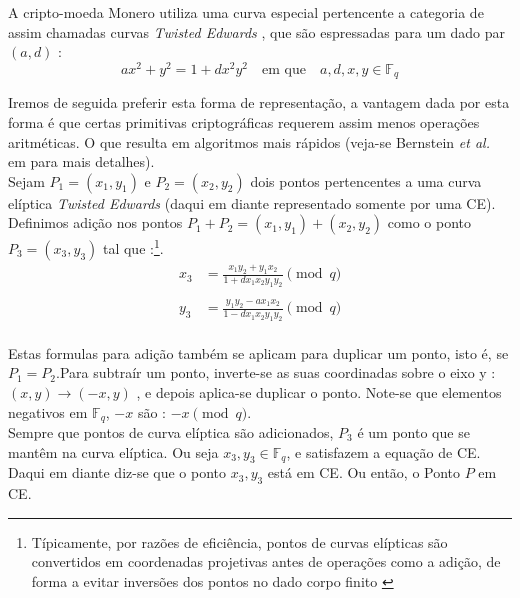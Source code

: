 A cripto-moeda Monero utiliza uma curva especial pertencente a categoria de assim chamadas curvas {\em Twisted Edwards} \cite{Bernstein2008}, que são espressadas para um dado par $(a,d)$ :
\vspace{.175cm}
\[a x^2 + y^2 = 1 + d x^2 y^2 \quad \textrm{em que} \quad a, d, x, y \in \mathbb{F}_q \]

Iremos de seguida preferir esta forma de representação, a vantagem dada por esta forma é que certas primitivas criptográficas requerem assim menos operações aritméticas. O que resulta em algoritmos mais rápidos (veja-se Bernstein {\em et al.} em \cite{Bernstein2007} para mais detalhes).\\

Sejam \(P_1 = (x_1, y_1)\) e \(P_2 = (x_2, y_2)\) dois pontos pertencentes a uma curva elíptica {\em Twisted Edwards} (daqui em diante representado somente por uma CE). Definimos adição nos pontos $P_1 + P_2 = (x_1, y_1) + (x_2, y_2)$ como o ponto $P_3 = (x_3, y_3)$ tal que :\footnote{Típicamente, por razões de eficiência, pontos de curvas elípticas são convertidos em coordenadas projetivas antes de operações como a adição, de forma a evitar inversões dos pontos no dado corpo finito \cite{ecc-projective}}.
\vspace{.375cm}
\begin{align*}
x_3 & =  \frac{x_1 y_2 + y_1 x_ 2}{1 + d x_1 x_2 y_1 y_2}  \pmod{q} \\
\\
y_3 & =  \frac{y_1 y_2 - a x_1 x_2}{1 - d x_1 x_2 y_1 y_2} \pmod{q} 
\end{align*}
\\
Estas formulas para adição também se aplicam para duplicar um ponto, isto é, se \(P_1 = P_2\).\newline Para subtraír um ponto, inverte-se as suas coordinadas sobre o eixo y : $(x,y) \rightarrow (-x,y)$ \cite{Bernstein2008}, e depois aplica-se duplicar o ponto. Note-se que elementos negativos em $\mathbb{F}_q$, $-x$ são : $-x \pmod{q}$.
\\
Sempre que pontos de curva elíptica são adicionados, $P_3$ é um ponto que se mantêm na curva elíptica. Ou seja $x_3,y_3 \in \mathbb{F}_q$, e satisfazem a equação de CE. Daqui em diante diz-se que o ponto $x_3,y_3$ está em CE. Ou então, o Ponto $P$ em CE. 

